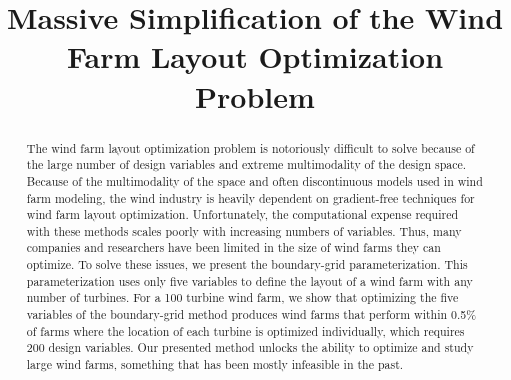 \documentclass[wes, manuscript]{copernicus}
\begin{document}
\title{Massive Simplification of the Wind Farm Layout Optimization Problem}











\received{}
\pubdiscuss{} %
\revised{}
\accepted{}
\published{}




\maketitle



\begin{abstract}
The wind farm layout optimization problem is notoriously difficult to solve because of the large number of design variables and extreme multimodality of the design space. 
Because of the multimodality of the space and often discontinuous models used in wind farm modeling, the wind industry is heavily dependent on gradient-free techniques for wind farm layout optimization. 
Unfortunately, the computational expense required with these methods scales poorly with increasing numbers of variables. Thus, many companies and researchers have been limited in the size of wind farms they can optimize.
To solve these issues, we present the boundary-grid parameterization. This parameterization uses only five variables to define the layout of a wind farm with any number of turbines. For a 100 turbine wind farm, we show that optimizing the five variables of the boundary-grid method produces wind farms that perform within 0.5\% of farms where the location of each turbine is optimized individually, which requires 200 design variables. Our presented method unlocks the ability to optimize and study large wind farms, something that has been mostly infeasible in the past.
\end{abstract}
\end{document}
